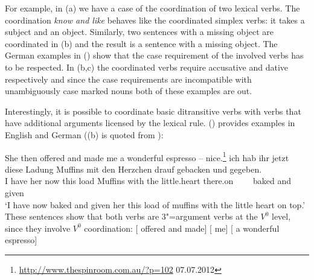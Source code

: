 For example, in (a) we have a case of the coordination of two lexical
verbs. The coordination \emph{know and like} behaves like the coordinated simplex verbs: it takes a
subject and an object. Similarly, two sentences with a missing object are coordinated in (b)
and the result is a sentence with a missing object. 
\eal
{}
\zl
The German examples in () show that the case requirement of the involved verbs has to be
respected. In (b,c) the coordinated verbs require accusative and dative respectively and since
the case requirements are incompatible with unambiguously case marked nouns both of these examples are out.
\eal
{}
\zl

\noindent
Interestingly, it is possible to coordinate basic ditransitive verbs with verbs that have
additional arguments licensed by the lexical rule. () provides examples in English and German
((b) is quoted from ):

\eal
\label{promise-make}
\ex She then offered and made me a wonderful espresso -- nice.\footnote{
\url{http://www.thespinroom.com.au/?p=102} 07.07.2012}
\ex 
\label{ex-gebacken-und-gegeben}
\gll ich hab ihr jetzt diese Ladung Muffins mit den Herzchen drauf gebacken und gegeben.\footnotemark\\
     I have her now this load Muffins with the little.heart there.on~~~~ baked and given\\
\glt `I have now baked and given her this load of muffins with the little heart on top.'
\zl
\noindent
These sentences show that both verbs are 3"=argument verbs at the $V^0$ level, since they involve $V^0$ coordination: 
\ea
{}[\sub{\vnull} offered and made] [ me]    [ a wonderful espresso] 
\z

